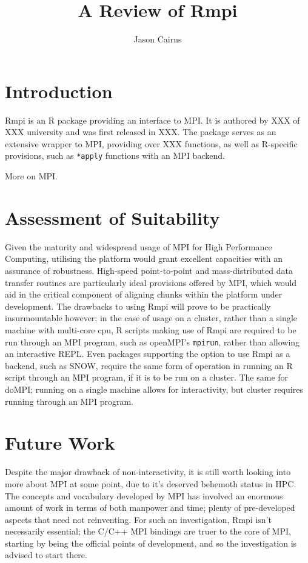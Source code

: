 \documentclass[a4paper]{article}
\begin{document}
\title{A Review of Rmpi}
\author{Jason Cairns}
  
\maketitle

\section{Introduction}

Rmpi is an R package providing an interface to MPI. It is authored by XXX of XXX university and was first released in XXX.
The package serves as an extensive wrapper to MPI, providing over XXX functions, as well as R-specific provisions, such as \texttt{*apply} functions with an MPI backend.

More on MPI.

\section{Assessment of Suitability}

Given the maturity and widespread usage of MPI for High Performance Computing, utilising the platform would grant excellent capacities with an assurance of robustness.
High-speed point-to-point and mass-distributed data transfer routines are particularly ideal provisions offered by MPI, which would aid in the critical component of aligning chunks within the platform under development.
The drawbacks to using Rmpi will prove to be practically insurmountable however; in the case of usage on a cluster, rather than a single machine with multi-core cpu, R scripts making use of Rmpi are required to be run through an MPI program, such as openMPI's \texttt{mpirun}, rather than allowing an interactive REPL.
Even packages supporting the option to use Rmpi as a backend, such as SNOW, require the same form of operation in running an R script through an MPI program, if it is to be run on a cluster.
The same for doMPI; running on a single machine allows for interactivity, but cluster requires running through an MPI program.

\section{Future Work}

Despite the major drawback of non-interactivity, it is still worth looking into more about MPI at some point, due to it's deserved behemoth status in HPC.
The concepts and vocabulary developed by MPI has involved an enormous amount of work in terms of both manpower and time; plenty of pre-developed aspects that need not reinventing.
For such an investigation, Rmpi isn't necessarily essential; the C/C++ MPI bindings are truer to the core of MPI, starting by being the official points of development, and so the investigation is advised to start there.
\end{document}
